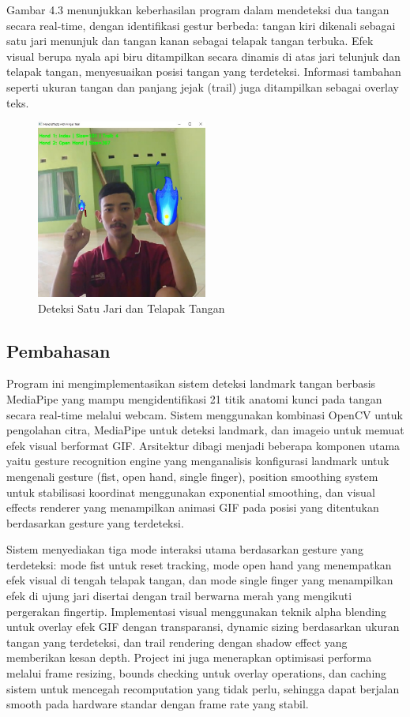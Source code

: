\documentclass[11pt,a4paper]{article}
\begin{document}
    Gambar 4.3 menunjukkan keberhasilan program dalam mendeteksi dua tangan secara real-time, dengan identifikasi gestur berbeda: tangan kiri dikenali sebagai satu jari menunjuk dan tangan kanan sebagai telapak tangan terbuka. Efek visual berupa nyala api biru ditampilkan secara dinamis di atas jari telunjuk dan telapak tangan, menyesuaikan posisi tangan yang terdeteksi. Informasi tambahan seperti ukuran tangan dan panjang jejak (trail) juga ditampilkan sebagai overlay teks.
    \begin{figure}[H]
        \centering
        \includegraphics[width=0.5\textwidth]{Figure/double-filter.jpg}
        \caption{Deteksi Satu Jari dan Telapak Tangan}
        \label{fig:number_detection}
    \end{figure}

    \subsection{Pembahasan}

    Program ini mengimplementasikan sistem deteksi landmark tangan berbasis MediaPipe yang mampu mengidentifikasi 21 titik anatomi kunci pada tangan secara real-time melalui webcam. Sistem menggunakan kombinasi OpenCV untuk pengolahan citra, MediaPipe untuk deteksi landmark, dan imageio untuk memuat efek visual berformat GIF. Arsitektur dibagi menjadi beberapa komponen utama yaitu gesture recognition engine yang menganalisis konfigurasi landmark untuk mengenali gesture (fist, open hand, single finger), position smoothing system untuk stabilisasi koordinat menggunakan exponential smoothing, dan visual effects renderer yang menampilkan animasi GIF pada posisi yang ditentukan berdasarkan gesture yang terdeteksi.
    
    Sistem menyediakan tiga mode interaksi utama berdasarkan gesture yang terdeteksi: mode fist untuk reset tracking, mode open hand yang menempatkan efek visual di tengah telapak tangan, dan mode single finger yang menampilkan efek di ujung jari disertai dengan trail berwarna merah yang mengikuti pergerakan fingertip. Implementasi visual menggunakan teknik alpha blending untuk overlay efek GIF dengan transparansi, dynamic sizing berdasarkan ukuran tangan yang terdeteksi, dan trail rendering dengan shadow effect yang memberikan kesan depth. Project ini juga menerapkan optimisasi performa melalui frame resizing, bounds checking untuk overlay operations, dan caching sistem untuk mencegah recomputation yang tidak perlu, sehingga dapat berjalan smooth pada hardware standar dengan frame rate yang stabil.
    
\end{document}
